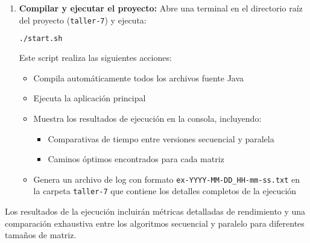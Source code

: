 \documentclass[12pt]{article}
\begin{document}
\begin{enumerate}
    \item \textbf{Compilar y ejecutar el proyecto:} Abre una terminal en el directorio raíz del proyecto (\texttt{taller-7}) y ejecuta:

    \begin{lstlisting}[language=bash,
                      frame=single,
                      numbers=none,
                      backgroundcolor=\color{gray!10},
                      basicstyle=\ttfamily\small,
                      caption={Script de compilación y ejecución}]
./start.sh
    \end{lstlisting}

    Este script realiza las siguientes acciones:
    \begin{itemize}
        \item Compila automáticamente todos los archivos fuente Java
        \item Ejecuta la aplicación principal
        \item Muestra los resultados de ejecución en la consola, incluyendo:
            \begin{itemize}
                \item Comparativas de tiempo entre versiones secuencial y paralela
                \item Caminos óptimos encontrados para cada matriz
            \end{itemize}
        \item Genera un archivo de log con formato \texttt{ex-YYYY-MM-DD\_HH-mm-ss.txt} en la carpeta \texttt{taller-7} que contiene los detalles completos de la ejecución
    \end{itemize}
\end{enumerate}

Los resultados de la ejecución incluirán métricas detalladas de rendimiento y una comparación exhaustiva entre los algoritmos secuencial y paralelo para diferentes tamaños de matriz.
\end{document}
